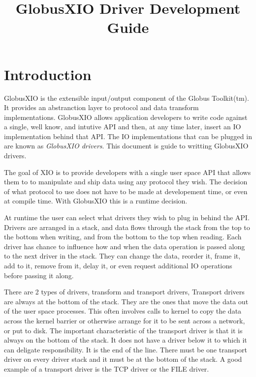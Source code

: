 \documentclass[11pt]{article}
\title{GlobusXIO Driver Development Guide}
\begin{document}
\maketitle

\section{Introduction}
GlobusXIO is the extensible input/output component of the Globus Toolkit(tm).
It provides an abstranction layer to protocol and data transform
implementations.  GlobusXIO allows application developers to write
code against a single, well know, and intutive API and then, at any time later,
insert an IO implementation behind that API.  The IO implementations
that can be plugged in are known as \emph{GlobusXIO drivers}.  
This document is guide to writting GlobusXIO drivers.

The goal of XIO is to provide developers with a single user space API
that allows them to to manipulate and ship data using any protocol they
wish.  The decision of what protocol to use does not have to be made
at developement time, or even at compile time.  With GlobusXIO this is
a runtime decision.  

At runtime the user can select what drivers they wish to plug in behind the
API.  Drivers are arranged in a stack, and data flows through the stack
from the top to the bottom when writing, and from the bottom to the
top when reading.  Each driver has chance to influence how and when
the data operation is passed along to the next driver in the stack.  
They can change the data, reorder it, frame it, add to it, remove from it,
delay it, or even request additional IO operations before passing it along.

There are 2 types of drivers, transform and transport drivers,
Transport drivers are always at the bottom of the stack.  They are 
the ones that move the data out of the user space processes.  This
often involves calls to kernel to copy the data across the kernel
barrier or otherwise arrange for it to be sent across a network, or
put to disk.  The important characteristic of the transport driver is
that it is always on the bottom of the stack.  It does not have
a driver below it to which it can deligate responsibility.  It is
the end of the line.  There must be one transport driver on every driver
stack and it must be at the bottom of the stack.  A good example of
a transport driver is the TCP driver or the FILE driver.
\end{document}
